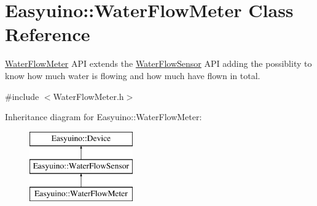 \hypertarget{class_easyuino_1_1_water_flow_meter}{}\section{Easyuino\+:\+:Water\+Flow\+Meter Class Reference}
\label{class_easyuino_1_1_water_flow_meter}


\hyperlink{class_easyuino_1_1_water_flow_meter}{Water\+Flow\+Meter} A\+PI extends the \hyperlink{class_easyuino_1_1_water_flow_sensor}{Water\+Flow\+Sensor} A\+PI adding the possiblity to know how much water is flowing and how much have flown in total.  




{\ttfamily \#include $<$Water\+Flow\+Meter.\+h$>$}

Inheritance diagram for Easyuino\+:\+:Water\+Flow\+Meter\+:\begin{figure}[H]
\begin{center}
\leavevmode
\includegraphics[height=3.000000cm]{class_easyuino_1_1_water_flow_meter}
\end{center}
\end{figure}
